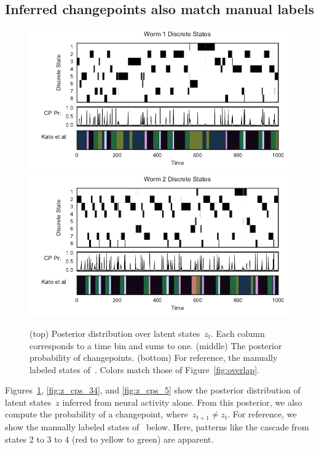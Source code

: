 \documentclass{article}
\begin{document}
\clearpage

\subsection{Inferred changepoints also match manual labels}

\begin{figure}[h]
\centering%
\includegraphics[width=5.5in]{figures/arhmm/z_cps_worm0.pdf}
\includegraphics[width=5.5in]{figures/arhmm/z_cps_worm1.pdf}
\caption{(top) Posterior distribution over latent states~$z_t$.
  Each column corresponds to a time bin and sums to one.
  (middle) The posterior probability of changepoints.
  (bottom) For reference,
  the manually labeled states of~\citet{kato2015global}. Colors match those
  of Figure~\ref{fig:overlap}.}
\label{fig:z_cps_12}
\end{figure}

Figures~\ref{fig:z_cps_12}, \ref{fig:z_cps_34}, and \ref{fig:z_cps_5}
show the posterior distribution of latent states~$z$ inferred from
neural activity alone. From this posterior, we also compute the probability
of a changepoint, where~$z_{t+1} \neq z_t$.  For reference, we show the
manually labeled states of~\citet{kato2015global} below. Here, patterns
like the cascade from states 2 to 3 to 4 (red to yellow to green) are
apparent. 
\end{document}
